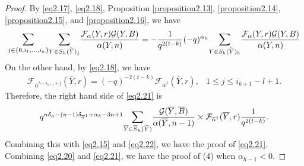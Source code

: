\documentclass[11pt,oneside]{amsart}
\theoremstyle{plain}
\theoremstyle{definition}
\theoremstyle{remark}
\newcommand{\CF}{{\mathcal F}}
\newcommand{\CG}{{\mathcal G}}
\numberwithin{equation}{section}
\begin{document}
\begin{proof}
		By \eqref{eq2.17}, \eqref{eq2.18}, Proposition \ref{proposition2.13}, \ref{proposition2.14}, \ref{proposition2.15}, and \ref{proposition2.16}, we have
		\begin{equation}\label{eq2.22}
			\mathlarger{\sum}_{j \in \lbrace 0,i_1,\dots,i_k \rbrace}\mathlarger{\sum}_{Y \in S_h(\widetilde{Y})_{j}}	\dfrac{\CF_{\alpha}(Y,r)\CG(Y,B)}{\alpha(Y,n)}=-\dfrac{1}{q^{2(t-k)}}(-q)^{\alpha_h}\mathlarger{\sum}_{Y \in S_h(\widetilde{Y})_{h}}	\dfrac{\CF_{\alpha}(Y,r)\CG(Y,B)}{\alpha(Y,n)}
		\end{equation}
		On the other hand, by \eqref{eq2.18}, we have
		\begin{equation*}\begin{array}{ll}
				\CF_{\overline{\alpha}^{h-i_{k+1}+j}}(\overline{Y},r)=(-q)^{-2(t-k)}\CF_{\overline{\alpha}^1}(\overline{Y},r), & 1 \leq j \leq i_{k+1}-l+1.
			\end{array}
		\end{equation*}
		Therefore, the right hand side of \eqref{eq2.21} is
		\begin{equation*}\begin{array}{l}
				q^{n\delta_{\alpha}-(n-1)\delta_{\overline{\alpha}^1}+\alpha_h-3n+1}\mathlarger{\sum}_{\overline{Y} \in \overline{S}_h(\widetilde{Y})}\dfrac{\CG(\overline{Y},\overline{B})}{\alpha(\overline{Y},n-1)}
				\times\CF_{\overline{\alpha}^{1}}(\overline{Y},r) \dfrac{1}{q^{2(t-k)}}.
			\end{array}
		\end{equation*}
		Combining this with \eqref{eq2.15} and \eqref{eq2.22}, we have the proof of \eqref{eq2.21}.
		Combining \eqref{eq2.20} and \eqref{eq2.21}, we have the proof of (4) when $\alpha_{h-1}<0$.
		

\end{proof}
\end{document}
